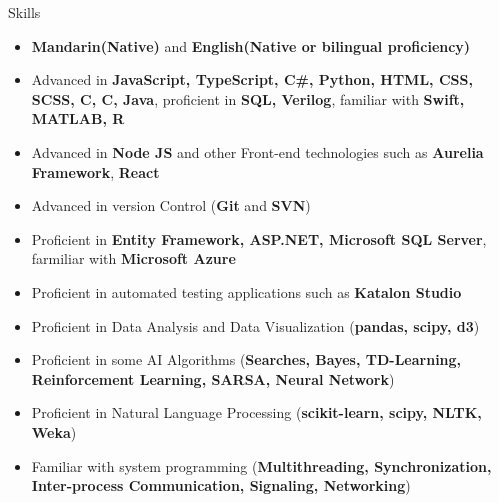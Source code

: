 \documentclass{resume}
\begin{document}
\begin{rSection}{Skills}

\begin{itemize}

    \item   \textbf{Mandarin(Native)} and \textbf{English(Native or bilingual proficiency)}
    \item	Advanced in \textbf{JavaScript, TypeScript, C\#, Python, HTML, CSS, SCSS, C, C\boldsymbol{++}, Java}, proficient in \textbf{SQL, Verilog}, familiar with \textbf{Swift, MATLAB, R}
    \item	Advanced in \textbf{Node JS} and other Front-end technologies such as \textbf{Aurelia Framework}, \textbf{React}
    \item   Advanced in version Control (\textbf{Git} and \textbf{SVN})
    \item	Proficient in \textbf{Entity Framework, ASP.NET, Microsoft SQL Server}, farmiliar with \textbf{Microsoft Azure}
    \item	Proficient in automated testing applications such as \textbf{Katalon Studio}	
    \item   Proficient in Data Analysis and Data Visualization (\textbf{pandas, scipy, d3})
    \item	Proficient in some AI Algorithms (\textbf{Searches, Bayes, TD-Learning, Reinforcement Learning, SARSA, Neural Network})
    \item	Proficient in Natural Language Processing (\textbf{scikit-learn, scipy, NLTK, Weka})
    \item	Familiar with system programming (\textbf{Multithreading, Synchronization, Inter-process Communication, Signaling, Networking})

\end{itemize}

\end{rSection}
\end{document}
